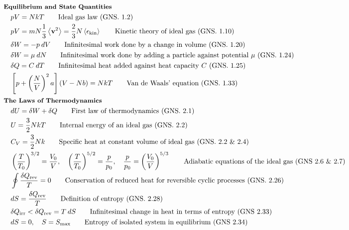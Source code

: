 \documentclass[10pt]{article}
\newcommand{\ve}[1]{\boldsymbol{\mathbf{#1}}}
\newcommand{\lrp}[1]{\left( #1 \right)}
\newcommand{\lrb}[1]{\left[ #1 \right]}
\newlength{\du}
\begin{document}
\begin{multicols}{2}
	\tiny
	\setlength{\abovedisplayskip}{-25pt}
	\setlength{\belowdisplayskip}{-25pt}
	\setlength{\abovedisplayshortskip}{0pt}
	\setlength{\belowdisplayshortskip}{0pt}
	\begin{align*}
	& \small \hspace{-10pt} \textbf{Equilibrium and State Quantities} \small \\
		& p V = NkT		\tag*{Ideal gas law (GNS. 1.2)} \\
		& p V = m N \frac{1}{3} \expval{\ve{v}^2} = \frac{2}{3} N \expval{\epsilon_{\text{kin}}}	\tag*{Kinetic theory of ideal gas (GNS. 1.10)} \\
		& \delta W = - p \: dV	\tag*{Infinitesimal work done by a change in volume (GNS. 1.20)} \\
		& \delta W = \mu \: dN	\tag*{Infinitesimal work done by adding a particle against potential $\mu$ (GNS. 1.24)} \\
		& \delta Q = C \: dT	\tag*{Infinitesimal heat added against heat capacity $C$ (GNS. 1.25)} \\
		& \lrb{p + \lrp{\frac{N}{V}}^2a}(V - Nb) = NkT	\tag*{Van de Waals' equation (GNS. 1.33)} \\
	& \small \hspace{-10pt} \textbf{The Laws of Thermodynamics} \small \\	
		& dU = \delta W + \delta Q	\tag*{First law of thermodynamics (GNS. 2.1)} \\
		& U = \frac{3}{2} N k T	\tag*{Internal energy of an ideal gas (GNS. 2.2)} \\
		& C_V = \frac{3}{2}	Nk	\tag*{Specific heat at constant volume of ideal gas (GNS. 2.2 \& 2.4)} \\
		& \lrp{\frac{T}{T_0}}^{3/2} = \frac{V_0}{V}, \quad \lrp{\frac{T}{T_0}}^{5/2} = \frac{p}{p_0}, \quad \frac{p}{p_0} = \lrp{\frac{V_0}{V}}^{5/3} \tag*{Adiabatic equations of the ideal gas (GNS 2.6 \& 2.7)} \\
		& \oint \frac{\delta Q_{\text{rev}}}{T} = 0		\tag*{Conservation of reduced heat for reversible cyclic processes (GNS. 2.26)} \\
		& dS =  \frac{\delta Q_{\text{rev}}}{T}	\tag*{Definition of entropy (GNS. 2.28)} \\
		& \delta Q_{\text{irr}} < \delta Q_{\text{rev}} = T \: dS	\tag*{Infinitesimal change in heat in terms of entropy (GNS 2.33)} \\
		& dS = 0, \quad S = S_{\text{max}}	\tag*{Entropy of isolated system in equilibrium (GNS 2.34)} \\

\end{align*}
\end{multicols}
\end{document}

